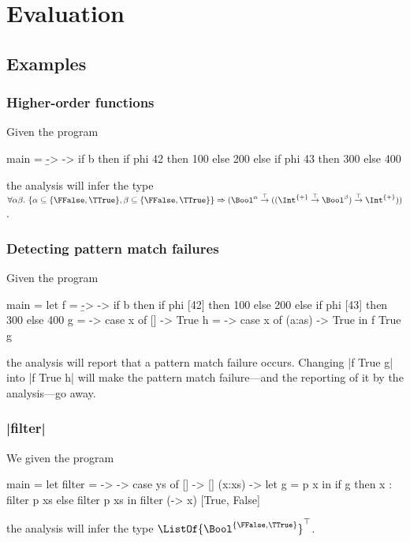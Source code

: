 \chapter{Evaluation}\label{chapevaluation}

\section{Examples}

\subsection{Higher-order functions}

Given the program
\begin{code}
main = \b -> \phi ->  if b
                      then  if  phi 42  then  100  else  200
                      else  if  phi 43  then  300  else  400
\end{code}
the analysis will infer the type $\forall \alpha\beta.\ \{\alpha \subseteq \{\FFalse,\TTrue\}, \beta \subseteq \{\FFalse, \TTrue\}\} \Rightarrow (\Bool^{\alpha} \overset{\top}{\to} ((\Int^{\{\mathbf{+}\}} \overset{\top}{\to} \Bool^{\beta}) \overset{\top}{\to} \Int^{\{\mathbf{+}\}}))$.

\subsection{Detecting pattern match failures}

Given the program
\begin{code}
main =  let  f =  \b  -> \phi ->  if b
                                  then  if  phi  [42]  then  100  else  200
                                  else  if  phi  [43]  then  300  else  400
             g =  \x  -> case  x of
                               []     -> True
             h =  \x  -> case  x of
                               (a:as) -> True
        in f True g
\end{code}
the analysis will report that a pattern match failure occurs. Changing |f True g| into |f True h| will make the pattern match failure---and the reporting of it by the analysis---go away.

\subsection{|filter|}
We given the program
\begin{code}
main = let filter = \p -> \ys -> case  ys of
                                       []      ->  []
                                       (x:xs)  ->  let g = p x
                                                   in if g  then x :  filter p xs
                                                            else      filter p xs
       in filter (\x -> x) [True, False]
\end{code}
the analysis will infer the type $\ListOf{\Bool^{\{\FFalse,\TTrue\}}}^\top$.

